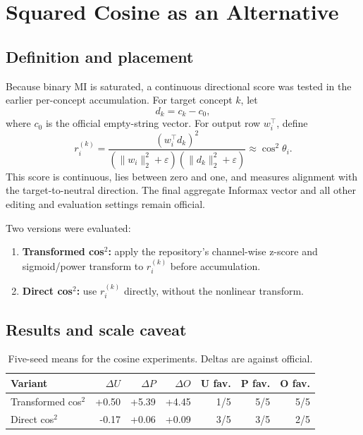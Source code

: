 \documentclass[11pt]{article}
\begin{document}
\section{Squared Cosine as an Alternative}
\label{sec:cos2}
\subsection{Definition and placement}
Because binary MI is saturated, a continuous directional score was tested in the earlier per-concept accumulation. For target concept $k$, let
\begin{equation}
    d_k=c_k-c_0,
\end{equation}
where $c_0$ is the official empty-string vector. For output row $w_i^{\top}$, define
\begin{equation}
    r_i^{(k)}=
    \frac{(w_i^{\top}d_k)^2}
    {(\|w_i\|_2^2+\varepsilon)(\|d_k\|_2^2+\varepsilon)}
    \approx\cos^2\theta_i.
    \label{eq:cos2}
\end{equation}
This score is continuous, lies between zero and one, and measures alignment with the target-to-neutral direction. The final aggregate Informax vector and all other editing and evaluation settings remain official.

Two versions were evaluated:
\begin{enumerate}[label=\arabic*.]
    \item \textbf{Transformed cos$^2$:} apply the repository's channel-wise z-score and sigmoid/power transform to $r_i^{(k)}$ before accumulation.
    \item \textbf{Direct cos$^2$:} use $r_i^{(k)}$ directly, without the nonlinear transform.
\end{enumerate}

\subsection{Results and scale caveat}
\begin{table}[H]
\centering
\caption{Five-seed means for the cosine experiments. Deltas are against official.}
\begin{tabular}{lrrrrrr}
\toprule
Variant & $\Delta U$ & $\Delta P$ & $\Delta O$ & U fav. & P fav. & O fav. \\
\midrule
Transformed cos$^2$ & +0.50 & +5.39 & +4.45 & 1/5 & 5/5 & 5/5 \\
Direct cos$^2$ & -0.17 & +0.06 & +0.09 & 3/5 & 3/5 & 2/5 \\
\bottomrule
\end{tabular}
\end{table}
\end{document}

